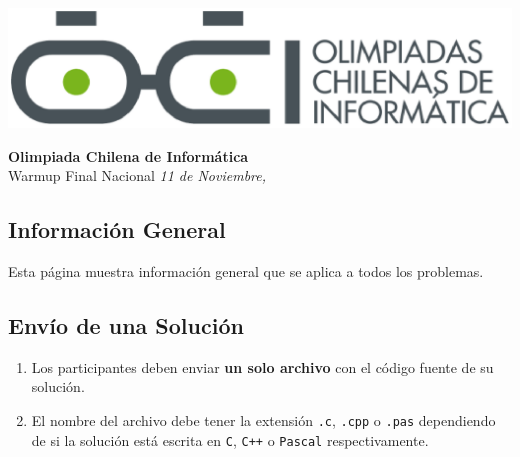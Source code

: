 \documentclass[12pt]{oci}
\begin{document}
\begin{titlingpage}
  \begin{center}
  \includegraphics[scale=0.6]{logo.eps}

  \vskip 70pt
  \Large{\bf Olimpiada Chilena de Inform\'atica\\ \the\year}
  \vskip 10pt
  \large{Warmup Final Nacional}
  \vskip 10pt
  \normalsize{\it 11 de Noviembre, \the\year}


  \vskip 95pt

  \end{center}

\end{titlingpage}


\subsection*{Informaci\'on General}

Esta p\'agina muestra informaci\'on general que se aplica a todos los problemas.

\subsection*{Env\'io de una Soluci\'on}


\begin{enumerate}
\itemsep 0em
\item Los participantes deben enviar {\bf un solo archivo} con el c\'odigo fuente de su soluci\'on.
\item El nombre del archivo debe tener la extensi\'on \verb+.c+, \verb+.cpp+ o \verb+.pas+ dependiendo de si la soluci\'on est\'a escrita en \verb|C|, \verb|C++| o \verb|Pascal| respectivamente.
\end{enumerate}
\end{document}

